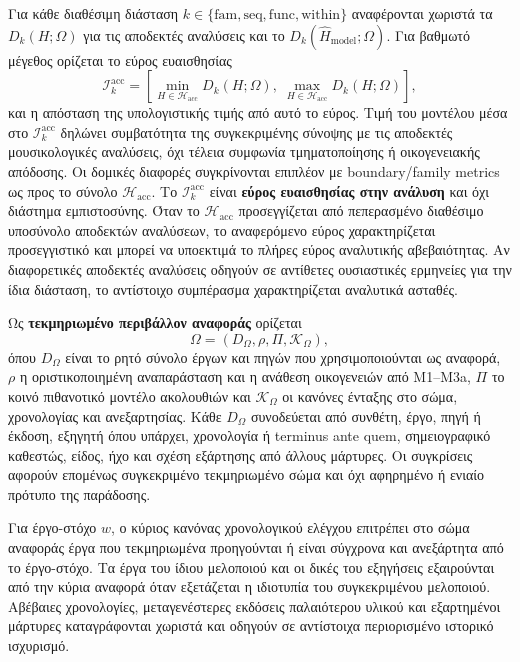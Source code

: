 \documentclass[11pt,a4paper]{article}
\begin{document}
Για κάθε διαθέσιμη διάσταση $k\in\{\mathrm{fam},\mathrm{seq},\mathrm{func},\mathrm{within}\}$ αναφέρονται χωριστά τα $D_k(H;\Omega)$ για τις αποδεκτές αναλύσεις και το $D_k(\widehat H_{\mathrm{model}};\Omega)$. Για βαθμωτό μέγεθος ορίζεται το εύρος ευαισθησίας
\[
\mathcal I_k^{\mathrm{acc}}=\left[\min_{H\in\mathcal H_{\mathrm{acc}}}D_k(H;\Omega),\;\max_{H\in\mathcal H_{\mathrm{acc}}}D_k(H;\Omega)\right],
\]
και η απόσταση της υπολογιστικής τιμής από αυτό το εύρος. Τιμή του μοντέλου μέσα στο $\mathcal I_k^{\mathrm{acc}}$ δηλώνει συμβατότητα της συγκεκριμένης σύνοψης με τις αποδεκτές μουσικολογικές αναλύσεις, όχι τέλεια συμφωνία τμηματοποίησης ή οικογενειακής απόδοσης. Οι δομικές διαφορές συγκρίνονται επιπλέον με boundary/family metrics ως προς το σύνολο $\mathcal H_{\mathrm{acc}}$. Το $\mathcal I_k^{\mathrm{acc}}$ είναι \textbf{εύρος ευαισθησίας στην ανάλυση} και όχι διάστημα εμπιστοσύνης. Όταν το $\mathcal H_{\mathrm{acc}}$ προσεγγίζεται από πεπερασμένο διαθέσιμο υποσύνολο αποδεκτών αναλύσεων, το αναφερόμενο εύρος χαρακτηρίζεται προσεγγιστικό και μπορεί να υποεκτιμά το πλήρες εύρος αναλυτικής αβεβαιότητας. Αν διαφορετικές αποδεκτές αναλύσεις οδηγούν σε αντίθετες ουσιαστικές ερμηνείες για την ίδια διάσταση, το αντίστοιχο συμπέρασμα χαρακτηρίζεται αναλυτικά ασταθές.


Ως \textbf{τεκμηριωμένο περιβάλλον αναφοράς} ορίζεται
\[
\Omega=(D_{\Omega},\rho,\Pi,\mathcal K_{\Omega}),
\]
όπου $D_{\Omega}$ είναι το ρητό σύνολο έργων και πηγών που χρησιμοποιούνται ως αναφορά, $\rho$ η οριστικοποιημένη αναπαράσταση και η ανάθεση οικογενειών από M1--M3a, $\Pi$ το κοινό πιθανοτικό μοντέλο ακολουθιών και $\mathcal K_{\Omega}$ οι κανόνες ένταξης στο σώμα, χρονολογίας και ανεξαρτησίας. Κάθε $D_{\Omega}$ συνοδεύεται από συνθέτη, έργο, πηγή ή έκδοση, εξηγητή όπου υπάρχει, χρονολογία ή terminus ante quem, σημειογραφικό καθεστώς, είδος, ήχο και σχέση εξάρτησης από άλλους μάρτυρες. Οι συγκρίσεις αφορούν επομένως συγκεκριμένο τεκμηριωμένο σώμα και όχι αφηρημένο ή ενιαίο πρότυπο της παράδοσης.

Για έργο-στόχο $w$, ο κύριος κανόνας χρονολογικού ελέγχου επιτρέπει στο σώμα αναφοράς έργα που τεκμηριωμένα προηγούνται ή είναι σύγχρονα και ανεξάρτητα από το έργο-στόχο. Τα έργα του ίδιου μελοποιού και οι δικές του εξηγήσεις εξαιρούνται από την κύρια αναφορά όταν εξετάζεται η ιδιοτυπία του συγκεκριμένου μελοποιού. Αβέβαιες χρονολογίες, μεταγενέστερες εκδόσεις παλαιότερου υλικού και εξαρτημένοι μάρτυρες καταγράφονται χωριστά και οδηγούν σε αντίστοιχα περιορισμένο ιστορικό ισχυρισμό.
\end{document}

